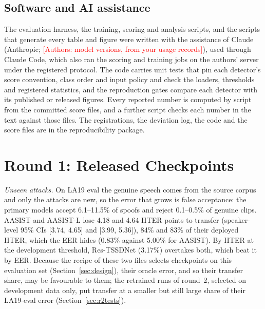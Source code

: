 \documentclass[review,authoryear]{elsarticle}
\newcommand{\todo}[1]{\textcolor{red}{[#1]}}
\newcommand{\tauE}{\tau^{*}_{\mathrm{EER}}}
\begin{document}
\subsection{Software and AI assistance}
\label{sec:software}
The evaluation harness, the training, scoring and analysis scripts, and the scripts that generate every table and figure
were written with the assistance of Claude (Anthropic; \todo{Authors: model versions, from your usage records}), used
through Claude Code, which also ran the scoring and training jobs on the authors' server under the registered protocol.
The code carries unit tests that pin each detector's score convention, class order and input policy and check the
loaders, thresholds and registered statistics, and the reproduction gates compare each detector with its published or
released figures. Every reported number is computed by script from the committed score files, and a further script
checks each number in the text against those files. The registrations, the deviation log, the code and the score files
are in the reproducibility package.

\section{Round 1: Released Checkpoints}
\label{sec:round1}
\begin{table}[!t]
\caption{Round 1: operating behaviour at the frozen \(\tauE\) (fp32, \%). HTER = oracle HTER (discrimination) + TTG
(transfer, pp); TTG/HTER is the transfer share (\%). The CI of TTG is a speaker-cluster bootstrap (B = 1,000).}
\label{tab:op}
\centering
\footnotesize
\setlength{\tabcolsep}{5pt}
\resizebox{\textwidth}{!}{}
\end{table}

\emph{Unseen attacks.} On LA19 eval the genuine speech comes from the source corpus and only the attacks are new, so the
error that grows is false acceptance: the primary models accept 6.1--11.5\% of spoofs and reject 0.1--0.5\% of genuine
clips. AASIST and AASIST-L lose 4.18 and 4.64 HTER points to transfer (speaker-level 95\% CIs [3.74, 4.65] and
[3.99, 5.36]), 84\% and 83\% of their deployed HTER, which the EER hides (0.83\% against 5.00\% for AASIST). By HTER at the
development threshold, Res-TSSDNet (3.17\%) overtakes both, which beat it by EER. Because the recipe of these two files
selects checkpoints on this evaluation set (Section~\ref{sec:design}), their oracle error, and so their transfer share,
may be favourable to them; the retrained runs of round~2, selected on development data only, put transfer at a smaller
but still large share of their LA19-eval error (Section~\ref{sec:r2tests}).
\end{document}

